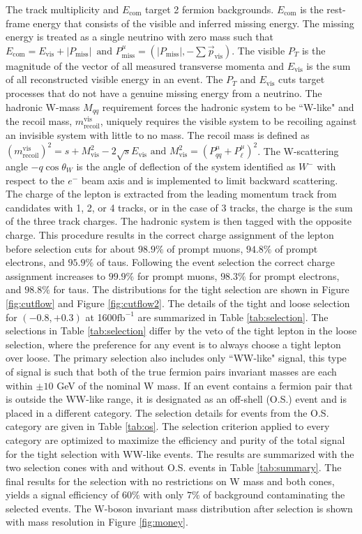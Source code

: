 The track multiplicity and $E_{\text{com}}$ target 2 fermion backgrounds. $E_{\text{com}}$ is the rest-frame energy that consists of the visible and inferred missing energy. The missing energy is treated as a single neutrino with zero mass such that $E_{\text{com}} = E_{\text{vis}} + |P_{\text{miss}}| \, \,  \, \text{and} \, \, P^\mu_{\text{miss}} = (|P_{\text{miss}}| , -\sum{\vec{p}_{\text{vis}}})$. The visible $P_T$ is the magnitude of the vector of all measured transverse momenta and $E_{\text{vis}}$ is the sum of all reconstructed visible energy in an event. The $P_T$ and $E_{\text{vis}}$ cuts target processes that do not have a genuine missing energy from a neutrino. The hadronic W-mass $M_{qq}$ requirement forces the hadronic system to be ``W-like" and the recoil mass, $m_{\text{recoil}}^{\text{vis}}$, uniquely requires the visible system to be recoiling against an invisible system with little to no mass. The recoil mass is defined as $(m_{ \text{recoil}}^{\text{vis}})^2 = s + M^2_{\text{vis}} - 2\sqrt{s}E_{\text{vis}} \, \, \text{and} \, \, M^2_{\text{vis}} = ( P^{\mu}_{qq} +  P^{\mu}_{\ell})^2$. The W-scattering angle $-q\cos\theta_W$ is the angle of deflection of the system identified as $W^-$ with respect to the $e^-$ beam axis and is implemented to limit backward scattering.  The charge of the lepton is extracted from the leading momentum track from candidates with 1, 2, or 4 tracks, or in the case of 3 tracks, the charge is the sum of the three track charges. The hadronic system is then tagged with the opposite charge.  This procedure results in the correct charge assignment of the lepton before selection cuts for about $98.9\%$ of prompt muons, $94.8\%$ of prompt electrons, and $95.9\%$ of taus. Following the event selection the correct charge assignment increases to $99.9\%$ for prompt muons, $98.3\%$ for prompt electrons, and $98.8\%$ for taus. The distributions for the tight selection are shown in Figure \ref{fig:cutflow} and Figure \ref{fig:cutflow2}. The details of the tight and loose selection for $(-0.8,+0.3)$ at 1600$\text{fb}^{-1}$ are summarized in Table \ref{tab:selection}. The selections in Table \ref{tab:selection} differ by the veto of the tight lepton in the loose selection, where the preference for any event is to always choose a tight lepton over loose. The primary selection also includes only ``WW-like" signal, this type of signal is such that both of the true fermion pairs invariant masses are each within $\pm10$ GeV of the nominal W mass. If an event contains a fermion pair that is outside the WW-like range, it is designated as an off-shell (O.S.) event and is placed in a different category. The selection details for events from the O.S. category are given in Table \ref{tab:os}. The selection criterion applied to every category are optimized to maximize the efficiency and purity of the total signal for the tight selection with WW-like events. The results are summarized with the two selection cones with and without O.S. events in Table \ref{tab:summary}. The final results for the selection with no restrictions on W mass and both cones, yields a signal efficiency of $60\%$ with only $7\%$ of background contaminating the selected events. The W-boson invariant mass distribution after selection is shown with mass resolution in Figure \ref{fig:money}.


